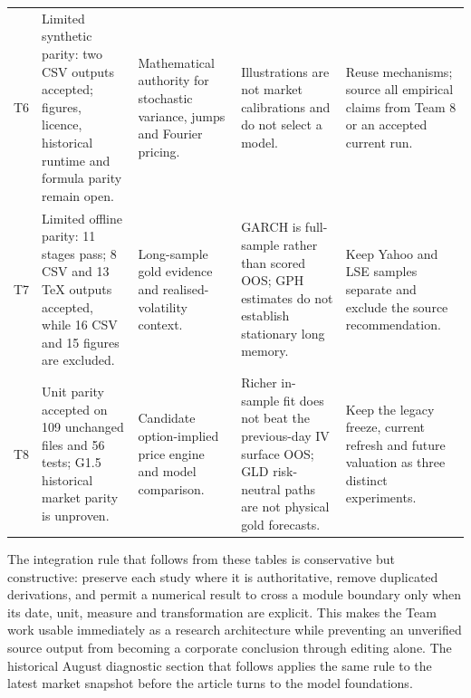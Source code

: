 \begin{table}[H]
\begin{tabularx}{\textwidth}{@{}p{0.85cm}p{2.97cm}X X X@{}}
T6 & Limited synthetic parity: two CSV outputs accepted; figures, licence,
historical runtime and formula parity remain open. & Mathematical authority for
stochastic variance, jumps and Fourier pricing. & Illustrations are not market
calibrations and do not select a model. & Reuse mechanisms; source all empirical
claims from Team 8 or an accepted current run. \\
T7 & Limited offline parity: 11 stages pass; 8 CSV and 13 TeX outputs accepted,
while 16 CSV and 15 figures are excluded. & Long-sample gold evidence and
realised-volatility context. & GARCH is full-sample rather than scored OOS;
GPH estimates do not establish stationary long memory. & Keep Yahoo and LSE
samples separate and exclude the source recommendation. \\
T8 & Unit parity accepted on 109 unchanged files and 56 tests; G1.5 historical
market parity is unproven. & Candidate option-implied price engine and model
comparison. & Richer in-sample fit does not beat the previous-day IV surface
OOS; GLD risk-neutral paths are not physical gold forecasts. & Keep the legacy
freeze, current refresh and future valuation as three distinct experiments. \\
\bottomrule
\end{tabularx}
\end{table}

The integration rule that follows from these tables is conservative but
constructive: preserve each study where it is authoritative, remove duplicated
derivations, and permit a numerical result to cross a module boundary only when
its date, unit, measure and transformation are explicit. This makes the Team
work usable immediately as a research architecture while preventing an
unverified source output from becoming a corporate conclusion through editing
alone. The historical August diagnostic section that follows applies the same rule to
the latest market snapshot before the article turns to the model foundations.
